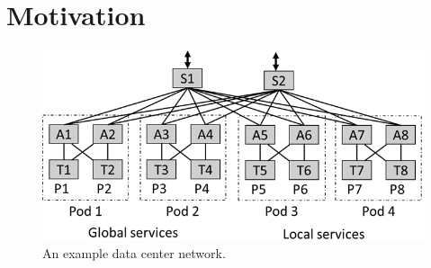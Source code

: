 \documentclass{sig-alternate-10pt}
\begin{document}


%
%
%
%

\section{Motivation}
\label{sec:motivation}

\begin{figure}[t!]
  \centering
  \includegraphics[width=\columnwidth]{figures/example}
  \caption{An example data center network.}
  \label{fig:example}
  \vspace{-1em}
\end{figure}
\end{document}
